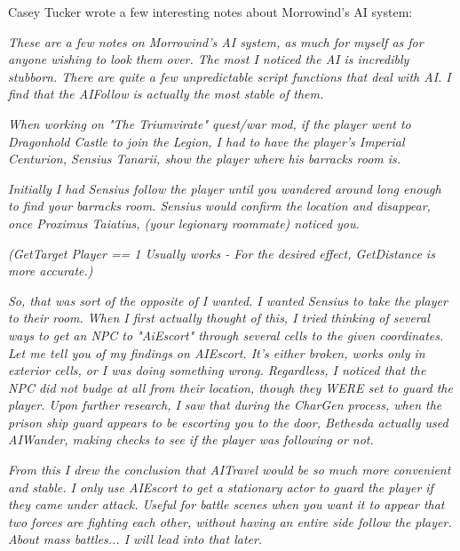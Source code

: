 Casey Tucker wrote a few interesting notes about Morrowind's AI system:

\emph{These are a few notes on Morrowind's AI system, as much for myself
as for anyone wishing to look them over. The most I noticed the AI is
incredibly stubborn. There are quite a few unpredictable script
functions that deal with AI. I find that the AIFollow is actually the
most stable of them.}

\emph{\hfill\break
When working on "The Triumvirate" quest/war mod, if the player went to
Dragonhold Castle to join the Legion, I had to have the player's
Imperial Centurion, Sensius Tanarii, show the player where his barracks
room is.}

\emph{\hfill\break
Initially I had Sensius follow the player until you wandered around long
enough to find your barracks room. Sensius would confirm the location
and disappear, once Proximus Taiatius, (your legionary roommate) noticed
you.}

\emph{(GetTarget Player == 1 Usually works - For the desired effect,
GetDistance is more accurate.)}

\emph{\hfill\break
So, that was sort of the opposite of I wanted. I wanted Sensius to take
the player to their room. When I first actually thought of this, I tried
thinking of several ways to get an NPC to "AiEscort" through several
cells to the given coordinates. Let me tell you of my findings on
AIEscort. It's either broken, works only in exterior cells, or I was
doing something wrong. Regardless, I noticed that the NPC did not budge
at all from their location, though they WERE set to guard the player.
Upon further research, I saw that during the CharGen process, when the
prison ship guard appears to be escorting you to the door, Bethesda
actually used AIWander, making checks to see if the player was following
or not.}

\emph{From this I drew the conclusion that AITravel would be so much
more convenient and stable. I only use AIEscort to get a stationary
actor to guard the player if they came under attack. Useful for battle
scenes when you want it to appear that two forces are fighting each
other, without having an entire side follow the player. About mass
battles... I will lead into that later.}

